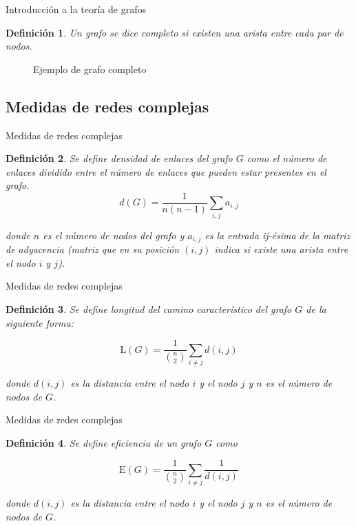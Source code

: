\documentclass[hyperref={unicode}]{beamer}
\newtheorem{defi}{\textbf{\color{ExecusharesBlue}Definición}}
\begin{document}
\begin{frame}{Introducción a la teoría de grafos}

		\begin{defi}\label{def:completo}
			Un grafo se dice completo si existen una arista entre cada par de nodos.
		\end{defi}

	\begin{figure}[htb]
		\centering
		\resizebox{0.25\textheight}{!}{\ejemplografocompleto}
		\caption{Ejemplo de grafo completo}
		\label{fig:grafo_completo}
	\end{figure}
\end{frame}



\subsection{Medidas de redes complejas}
\begin{frame}{Medidas de redes complejas}
	\begin{defi}
		Se define densidad de enlaces del grafo $G$ como el número de enlaces dividido entre el número de enlaces que pueden estar presentes en el grafo.
		\begin{equation}\label{eq:densidad}
		d(G) = \dfrac{1}{n(n-1)} \sum_{i,j} a_{i,j}
		\end{equation}
		
		donde $n$ es el número de nodos del grafo y $a_{i,j}$ es la entrada ij-ésima de la matriz de adyacencia (matriz que en su posición $(i,j)$ indica si existe una arista entre el nodo $i$ y $j$).
	\end{defi}
\end{frame}

\begin{frame}{Medidas de redes complejas}
	\begin{defi}
	Se define longitud del camino característico del grafo $G$ de la siguiente forma:
		
		\begin{equation}\label{eq:camino}
		\mathrm{L}({G}) = \dfrac{1}{\binom{n}{2}} \sum_{i\neq j} d(i,j)
		\end{equation}
		
		donde $d(i,j)$ es la distancia entre el nodo $i$ y el nodo $j$ y $n$ es el número de nodos de $G$.
	\end{defi}
\end{frame}

\begin{frame}{Medidas de redes complejas}
	\begin{defi}
	Se define eficiencia de un grafo $G$ como
		
		\begin{equation}\label{eq:eficiencia}
		\mathrm{E}({G}) = \dfrac{1}{\binom{n}{2}} \sum_{i\neq j} \dfrac{1}{d(i,j)}
		\end{equation}
		
		donde $d(i,j)$ es la distancia entre el nodo $i$ y el nodo $j$ y $n$ es el número de nodos de $G$.
	\end{defi}
\end{frame}
\end{document}
